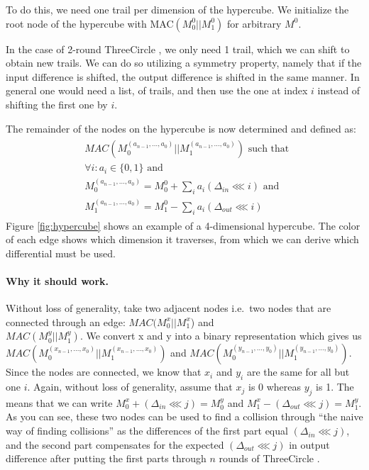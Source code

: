 \documentclass{report}
\newcommand{\ThreeCircle}{{\sc ThreeCircle} }
\begin{document}
To do this, we need one trail per dimension of the hypercube. We initialize the root node of the hypercube with MAC$(M^0_0 || M^0_1)$ for arbitrary $M^0$.

In the case of 2-round \ThreeCircle, we only need 1 trail, which we can shift to obtain new trails. We can do so utilizing a symmetry property, namely that if the input difference is shifted, the output difference is shifted in the same manner. In general one would need a list, of trails, and then use the one at index $i$ instead of shifting the first one by $i$.

The remainder of the nodes on the hypercube is now determined and defined as:
\begin{align}
\begin{split}
&MAC(M^{(a_{n-1},\dots, a_0)}_0 || M^{(a_{n-1}, \dots, a_0)}_1) \text{ such that }\\
&\forall i: a_i \in \{0, 1\} \text{ and } \\
&M^{(a_{n-1},\dots, a_0)}_0 = M^0_0 + \sum_i a_i(\Delta_{in} \lll i) \text{ and }\\
&M^{(a_{n-1},\dots, a_0)}_1 = M^0_1 - \sum_i a_i(\Delta_{out} \lll i)
\end{split}
\end{align}
Figure \ref{fig:hypercube} shows an example of a 4-dimensional hypercube.
The color of each edge shows which dimension it traverses, from which we can derive which differential must be used.

\paragraph{Why it should work.} Without loss of generality, take two adjacent nodes i.e.\ two nodes that are connected through an edge:
$MAC(M^x_0||M^x_1$) and\\$MAC(M^y_0||M^y_1)$.
We convert x and y into a binary representation which gives us \\$MAC(M^{(x_{n-1},\dots, x_0)}_0 || M^{(x_{n-1},\dots, x_0)}_1)$
and $MAC(M^{(y_{n-1},\dots, y_0)}_0 || M^{(y_{n-1},\dots, y_0)}_1)$.
Since the nodes are connected, we know that $x_i$ and $y_i$ are the same for all but one $i$.
Again, without loss of generality, assume that $x_j$ is 0 whereas $y_j$ is 1. The means that we can write $M^x_0 + (\Delta_{in} \lll j) = M^y_0$ and $M^x_1 - (\Delta_{out} \lll j) = M^y_1$.
As you can see, these two nodes can be used to find a collision through ``the naive way of finding collisions'' as the differences of the first part equal $(\Delta_{in} \lll j)$, and the second part compensates for the expected $(\Delta_{out} \lll j)$ in output difference after putting the first parts through $n$ rounds of \ThreeCircle. 
\end{document}
